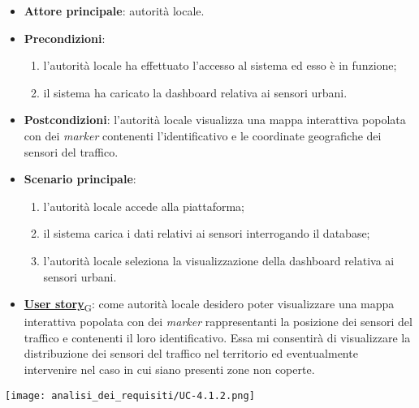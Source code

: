 \begin{itemize}
	\item \textbf{Attore principale}: autorità locale.
	\item \textbf{Precondizioni}:
	      \begin{enumerate}
		      \item l'autorità locale ha effettuato l'accesso al sistema ed esso è in funzione;
		      \item il sistema ha caricato la dashboard relativa ai sensori urbani.
	      \end{enumerate}
	\item \textbf{Postcondizioni}: l'autorità locale visualizza una mappa interattiva popolata con dei \textit{marker} contenenti l'identificativo e le coordinate geografiche dei sensori del traffico.
	\item \textbf{Scenario principale}:
	      \begin{enumerate}
		      \item l'autorità locale accede alla piattaforma;
		      \item il sistema carica i dati relativi ai sensori interrogando il database;
		      \item l'autorità locale seleziona la visualizzazione della dashboard relativa ai sensori urbani.
	      \end{enumerate}
	\item \href{https://7last.github.io/docs/pb/documentazione-interna/glossario\#user-story}{\textbf{User story}\textsubscript{G}}:
	      come autorità locale desidero poter visualizzare una mappa interattiva popolata con dei \textit{marker} rappresentanti la posizione dei sensori del traffico
	      e contenenti il loro identificativo. Essa mi consentirà di visualizzare la distribuzione dei sensori del traffico nel territorio ed eventualmente intervenire nel caso in cui siano presenti zone non coperte.
\end{itemize}
\begin{center}
	\texttt{[image: analisi\_dei\_requisiti/UC-4.1.2.png]}
\end{center}


